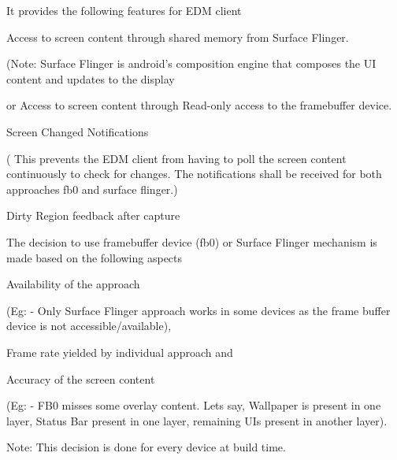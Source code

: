 \-It provides the following features for \-E\-D\-M client\par

\begin{DoxyItemize}
\item \-Access to screen content through shared memory from \-Surface \-Flinger. \par
 (\-Note\-: \-Surface \-Flinger is android's composition engine that composes the \-U\-I content and updates to the display\par

\item or \-Access to screen content through \-Read-\/only access to the framebuffer device.\par

\item \-Screen \-Changed \-Notifications\par
 ( \-This prevents the \-E\-D\-M client from having to poll the screen content continuously to check for changes. \-The notifications shall be received for both approaches fb0 and surface flinger.)\par

\item \-Dirty \-Region feedback after capture\par
 
\end{DoxyItemize}

\-The decision to use framebuffer device (fb0) or \-Surface \-Flinger mechanism is made based on the following aspects\par

\begin{DoxyItemize}
\item \-Availability of the approach \par
 (\-Eg\-: -\/ \-Only \-Surface \-Flinger approach works in some devices as the frame buffer device is not accessible/available),\par

\item \-Frame rate yielded by individual approach and \par

\item \-Accuracy of the screen content \par
 (\-Eg\-: -\/ \-F\-B0 misses some overlay content. \-Lets say, \-Wallpaper is present in one layer, \-Status \-Bar present in one layer, remaining \-U\-Is present in another layer). \par
 \-Note\-: \-This decision is done for every device at build time.\par
 
\end{DoxyItemize}

